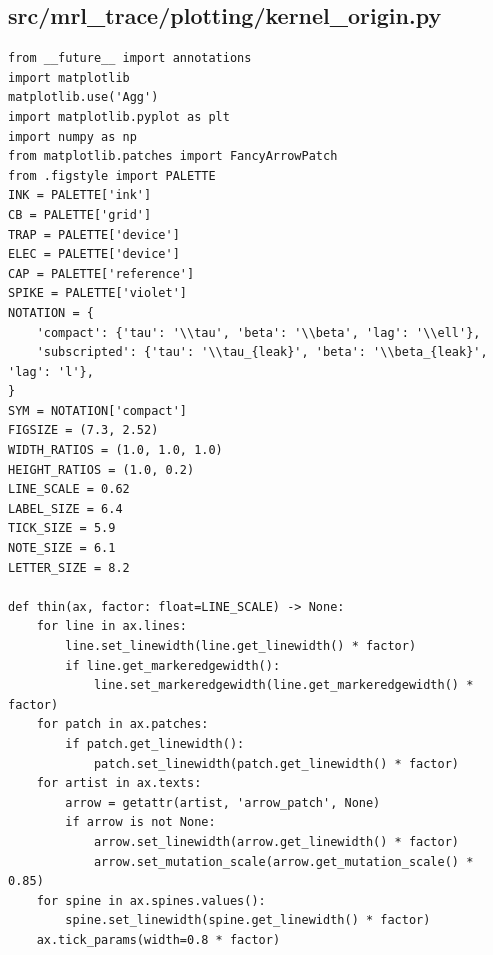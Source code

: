 \documentclass[a4paper,10pt]{article}
\begin{document}
\subsection{src/mrl\_trace/plotting/kernel\_origin.py}
\begin{Verbatim}
from __future__ import annotations
import matplotlib
matplotlib.use('Agg')
import matplotlib.pyplot as plt
import numpy as np
from matplotlib.patches import FancyArrowPatch
from .figstyle import PALETTE
INK = PALETTE['ink']
CB = PALETTE['grid']
TRAP = PALETTE['device']
ELEC = PALETTE['device']
CAP = PALETTE['reference']
SPIKE = PALETTE['violet']
NOTATION = {
    'compact': {'tau': '\\tau', 'beta': '\\beta', 'lag': '\\ell'},
    'subscripted': {'tau': '\\tau_{leak}', 'beta': '\\beta_{leak}', 'lag': 'l'},
}
SYM = NOTATION['compact']
FIGSIZE = (7.3, 2.52)
WIDTH_RATIOS = (1.0, 1.0, 1.0)
HEIGHT_RATIOS = (1.0, 0.2)
LINE_SCALE = 0.62
LABEL_SIZE = 6.4
TICK_SIZE = 5.9
NOTE_SIZE = 6.1
LETTER_SIZE = 8.2

def thin(ax, factor: float=LINE_SCALE) -> None:
    for line in ax.lines:
        line.set_linewidth(line.get_linewidth() * factor)
        if line.get_markeredgewidth():
            line.set_markeredgewidth(line.get_markeredgewidth() * factor)
    for patch in ax.patches:
        if patch.get_linewidth():
            patch.set_linewidth(patch.get_linewidth() * factor)
    for artist in ax.texts:
        arrow = getattr(artist, 'arrow_patch', None)
        if arrow is not None:
            arrow.set_linewidth(arrow.get_linewidth() * factor)
            arrow.set_mutation_scale(arrow.get_mutation_scale() * 0.85)
    for spine in ax.spines.values():
        spine.set_linewidth(spine.get_linewidth() * factor)
    ax.tick_params(width=0.8 * factor)


\end{Verbatim}
\end{document}
